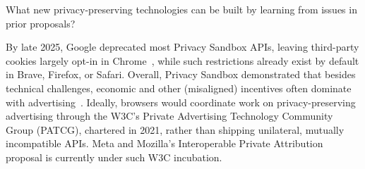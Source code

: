 %
%
%

\begin{opbox}
What new privacy-preserving technologies can be built by learning from issues in prior proposals? 
\end{opbox}

By late 2025, Google deprecated most Privacy Sandbox APIs, leaving third-party cookies largely opt-in in Chrome~\cite{chavezUpdatePlansPrivacy2025,gribRiseFallGoogle2026}, while such restrictions already exist by default in Brave, Firefox, or Safari.
%
Overall, Privacy Sandbox demonstrated that besides technical challenges, economic and other (misaligned) incentives often dominate with advertising~\cite{beuginTechnicalReportNeed2025,beuginLessonsAdoptionDeprecation2026}.
%
Ideally, browsers would coordinate work on privacy-preserving advertising through the W3C's Private Advertising Technology Community Group (PATCG), chartered in 2021, rather than shipping unilateral, mutually incompatible APIs.
%
Meta and Mozilla's Interoperable Private Attribution proposal is currently under such W3C incubation.

